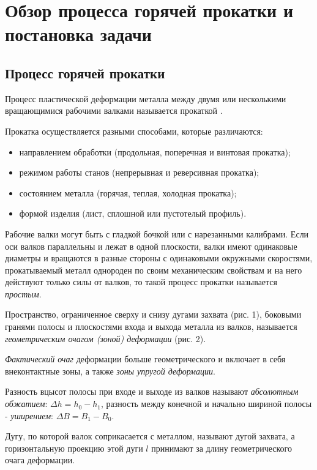 \newpage

\section{Обзор процесса горячей прокатки и постановка задачи} 

\subsection{Процесс горячей прокатки}

Процесс пластической деформации металла между двумя или несколькими вращающимися рабочими валками называется прокаткой \cite{Tselikov}.

Прокатка осуществляется разными способами, которые различаются:
\begin{itemize}
\item направлением обработки (продольная, поперечная и винтовая
прокатка);
\item режимом работы станов (непрерывная и реверсивная прокатка);
\item состоянием металла (горячая, теплая, холодная прокатка);
\item формой изделия (лист, сплошной или пустотелый профиль).
\end{itemize}

Рабочие валки могут быть с гладкой бочкой или с нарезанными калибрами. Если оси валков параллельны и лежат в одной плоскости, валки имеют одинаковые диаметры и вращаются в разные стороны с одинаковыми окружными скоростями, прокатываемый металл однороден по своим механическим свойствам и на него действуют только силы от валков, то такой процесс прокатки называется \textit{простым}.

Пространство, ограниченное сверху и снизу дугами захвата (рис. 1), боковыми гранями полосы и плоскостями входа и выхода металла из валков, называется \textit{геометрическим очагом (зоной) деформации} (рис. 2).


\textit{Фактический очаг} деформации больше геометрического и включает в себя внеконтактные зоны, а также \textit{зоны упругой деформации}.

Разность  вцысот полосы при входе и выходе из валков называют \textit{абсолютным обжатием}: $\Delta h = h_0 - h_1$, разность между конечной и начально шириной полосы - \textit{уширением}: $\Delta B = B_1 - B_0$.

Дугу, по которой валок соприкасается с металлом, называют дугой захвата, а горизонтальную проекцию этой дуги $l$ принимают за длину геометрического очага деформации.

